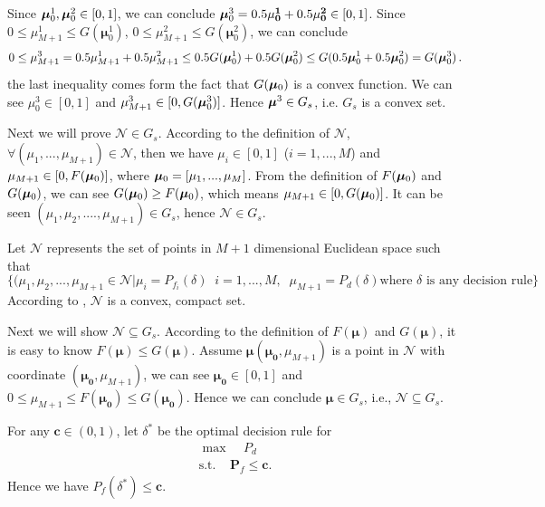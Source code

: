 \documentclass[12pt,journal,a4paper,twoside,onecolumn]{IEEEtran}
\begin{document}
\begin{spacing}{2.5}
Since $\boldsymbol{\mu}^1_0, \boldsymbol{\mu}^2_0 \in [0, 1]$, we can conclude $\boldsymbol{\mu}_0^3 = 0.5 \mathbf{\mu^1_0}+ 0.5\mathbf{\mu^2_0} \in [0, 1]$. Since $0 \leq \mu_{M+1}^1 \leq G(\boldsymbol{\mu}_0^1)$,  $0 \leq \mu_{M+1}^2 \leq G(\boldsymbol{\mu}_0^2)$, we can conclude 
\[
0 \leq \mu_{M+1}^3 = 0.5\mu_{M+1}^1 + 0.5\mu_{M+1}^2 \leq 0.5 G(\boldsymbol{\mu}_0^1) + 0.5G(\boldsymbol{\mu}_0^2) \leq G(0.5 \boldsymbol{\mu}_0^1+0.5\boldsymbol{\mu}_0^2) = G(\boldsymbol{\mu}^3_0)\,.
\]
the last inequality comes form the fact that $G(\boldsymbol{\mu}_0)$  is a convex function. We can see $\mu^3_0 \in [0, 1]$ and $\mu_{M+1}^3 \in [0, G(\boldsymbol{\mu}^3_0)]$. Hence $\boldsymbol{\mu}^3 \in G_s$, i.e. $G_s$  is a convex set.  

Next we will prove $\mathcal{N} \in G_s$. 
According to the definition of $\mathcal{N}$, $\forall (\mu_1, ..., \mu_{M+1}) \in \mathcal{N}$, then we have $\mu_i \in [0, 1]$ ($i = 1, ..., M$) and $\mu_{M+1} \in [0, F(\boldsymbol{\mu}_0)]$, where $\boldsymbol{\mu}_0 = [\mu_1, ..., \mu_M]$. From the definition of $F(\boldsymbol{\mu}_0)$ and $G(\boldsymbol{\mu}_0)$, we can see $G(\boldsymbol{\mu}_0) \geq F(\boldsymbol{\mu}_0)$, which means $\mu_{M+1} \in [0, G(\boldsymbol{\mu}_0)]$. It can be seen $(\mu_1, \mu_2, ...., \mu_{M+1}) \in G_s$, hence $\mathcal{N} \in G_s$.

Let $\mathcal{N}$ represents the set of points in $M+1$ dimensional Euclidean space such that  
\[
\{(\mu_1, \mu_2, ..., \mu_{M+1}\in \mathcal{N} | \mu_i = P_{f_i}(\delta)\;\;i=1, ..., M,\;\;\mu_{M+1}=P_d(\delta) \text{where $\delta$ is any decision rule}\}
\]
According to \cite{LehmannTest}, $\mathcal{N}$ is a convex, compact set.

Next we will show $\mathcal{N} \subseteq G_s$. According to the definition of $F(\boldsymbol{\mu})$ and $G(\boldsymbol{\mu})$, it is easy to know $F(\boldsymbol{\mu}) \leq G(\boldsymbol{\mu})$. Assume $\mathbf{\mu} (\mathbf{\mu_0}, \mu_{M+1})$ is a point in $\mathcal{N}$ with coordinate $(\mathbf{\mu_0}, \mu_{M+1})$, we can see $\boldsymbol{\mu_0} \in [0, 1]$ and $0 \leq \mu_{M+1} \leq F(\boldsymbol{\mu_0}) \leq G(\boldsymbol{\mu_0})$. Hence we can conclude $\boldsymbol{\mu} \in G_s$, i.e., $\mathcal{N} \subseteq G_s$.

For any $\mathbf{c} \in  (0, 1)$, let $\delta^\ast$ be the optimal decision rule for 
\begin{equation}
\begin{split}
\label{equ: dd}
\max\;\;\;\;P_d\\
\text{s.t.}\;\;\;\;\mathbf{P}_f \leq \mathbf{c}.
\end{split}
\end{equation}
Hence we have $P_f(\delta^\ast) \leq \mathbf{c}$.


\end{spacing}
\end{document}
